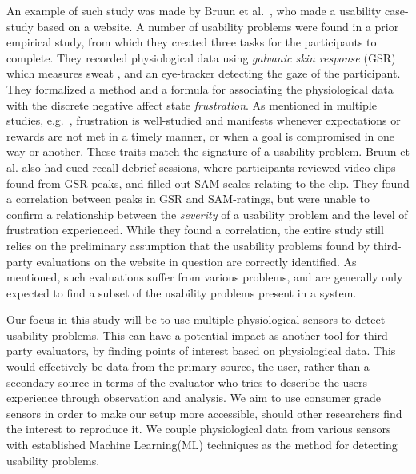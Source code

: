 An example of such study was made by Bruun et al.~\cite{LH-paper}, who made a usability case-study based on a website.
A number of usability problems were found in a prior empirical study, from which they created three tasks for the participants to complete.
They recorded physiological data using \textit{galvanic skin response} (GSR) which measures sweat \cite{gsr_calibration}, and an eye-tracker detecting the gaze of the participant.
They formalized a method and a formula for associating the physiological data with the discrete negative affect state \textit{frustration}.
As mentioned in multiple studies, e.g.~\cite{LH-paper,frustration_with_computers}, frustration is well-studied
and manifests whenever expectations or rewards are not met in a timely manner, or when a goal is compromised in one way or another.
These traits match the signature of a usability problem.
Bruun et al. also had cued-recall debrief sessions, where participants reviewed video clips found from GSR peaks, and filled out SAM scales relating to the clip. 
They found a correlation between peaks in GSR and SAM-ratings, but were unable to confirm a relationship between the
\textit{severity} of a usability problem and the level of frustration experienced.
While they found a correlation, the entire study still relies on the preliminary assumption that the usability problems found by
third-party evaluations on the website in question are correctly identified.
As mentioned, such evaluations suffer from various problems, and are generally only expected to find a subset of the usability problems present in a system. 

Our focus in this study will be to use multiple physiological sensors to detect usability problems.
This can have a potential impact as another tool for third party evaluators, by finding points of interest based on physiological data. 
This would effectively be data from the primary source, the user, rather than a secondary source in terms of the evaluator who tries to describe the users experience through observation and analysis. 
We aim to use consumer grade sensors in order to make our setup more accessible, should other researchers find the interest to reproduce
it. We couple physiological data from various sensors with established Machine Learning(ML) techniques as the method for
detecting usability problems.



%
   

